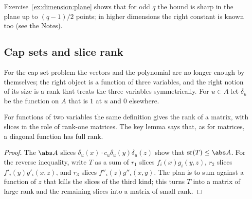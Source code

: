 \begin{refsection}
Exercise~\ref{ex:dimension:plane} shows that for odd $q$ the bound is sharp in the plane up to $(q-1)/2$ points; in higher dimensions the right constant is known too (see the Notes).

\subsection{Cap sets and slice rank}\label{sec:dimension:capset}

For the cap set problem the vectors and the polynomial are no longer enough by themselves; the right object is a function of three variables, and the right notion of its size is a rank that treats the three variables symmetrically. For $u\in A$ let $\delta_u$ be the function on $A$ that is $1$ at $u$ and $0$ elsewhere.


For functions of two variables the same definition gives the rank of a matrix, with slices in the role of rank-one matrices. The key lemma says that, as for matrices, a diagonal function has full rank.


\begin{proof}
The $\abs A$ slices $\delta_u(x)\cdot c_u\delta_u(y)\delta_u(z)$ show that $\dimensionSR(T)\le\abs A$. For the reverse inequality, write $T$ as a sum of $r_1$ slices $f_i(x)g_i(y,z)$, $r_2$ slices $f'_i(y)g'_i(x,z)$, and $r_3$ slices $f''_i(z)g''_i(x,y)$. The plan is to sum against a function of $z$ that kills the slices of the third kind; this turns $T$ into a matrix of large rank and the remaining slices into a matrix of small rank.


\end{proof}
\end{refsection}

